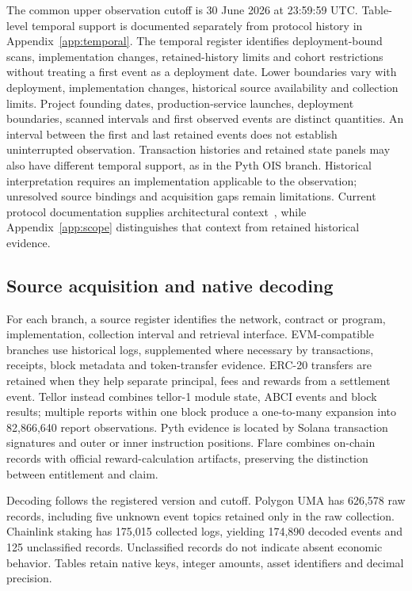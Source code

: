 The common upper observation cutoff is 30 June 2026 at 23:59:59 UTC. Table-level temporal support is documented separately from protocol history in Appendix~\ref{app:temporal}. The temporal register identifies deployment-bound scans, implementation changes, retained-history limits and cohort restrictions without treating a first event as a deployment date. Lower boundaries vary with deployment, implementation changes, historical source availability and collection limits. Project founding dates, production-service launches, deployment boundaries, scanned intervals and first observed events are distinct quantities. An interval between the first and last retained events does not establish uninterrupted observation. Transaction histories and retained state panels may also have different temporal support, as in the Pyth OIS branch. Historical interpretation requires an implementation applicable to the observation; unresolved source bindings and acquisition gaps remain limitations. Current protocol documentation supplies architectural context~\cite{uma2026,chainlinkstaking2026,tellorDisputes2026,flareFTSO2026,pythOIS2026,chronicleDocs2026,redstoneDocs2026,diaDocs2026}, while Appendix~\ref{app:scope} distinguishes that context from retained historical evidence.



\subsection{Source acquisition and native decoding}

For each branch, a source register identifies the network, contract or program, implementation, collection interval and retrieval interface. EVM-compatible branches use historical logs, supplemented where necessary by transactions, receipts, block metadata and token-transfer evidence. ERC-20 transfers are retained when they help separate principal, fees and rewards from a settlement event. Tellor instead combines tellor-1 module state, ABCI events and block results; multiple reports within one block produce a one-to-many expansion into 82,866,640 report observations. Pyth evidence is located by Solana transaction signatures and outer or inner instruction positions. Flare combines on-chain records with official reward-calculation artifacts, preserving the distinction between entitlement and claim.

Decoding follows the registered version and cutoff. Polygon UMA has 626,578 raw records, including five unknown event topics retained only in the raw collection. Chainlink staking has 175,015 collected logs, yielding 174,890 decoded events and 125 unclassified records. Unclassified records do not indicate absent economic behavior. Tables retain native keys, integer amounts, asset identifiers and decimal precision.

